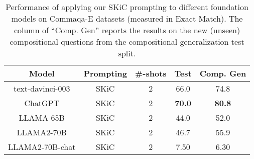 \documentclass{article} \usepackage{arxiv}
\begin{document}
\begin{table}[ht]
\caption{Performance of applying our SKiC prompting to different foundation models on Commaqa-E datasets (measured in Exact Match). The column of ``Comp. Gen'' reports the results on the new (unseen) compositional questions from the compositional generalization test split.} \label{Tab:qa_results_llama2}
\centering
\small
\begin{tabular}{c|c|c|cc} \toprule
\textbf{Model}             & \textbf{Prompting} &\textbf{\#-shots} & \multicolumn{1}{l}{\textbf{Test}} & \multicolumn{1}{l}{\textbf{Comp. Gen}} \\ \midrule \midrule

\multirow{1}{*}{text-davinci-003} 
                           &  SKiC   &2  &66.0                     & 74.8                         \\ 
\multirow{1}{*}{ChatGPT}  
                           & SKiC   &2   & \textbf{70.0}                    & \textbf{80.8}                 \\ \midrule

\multirow{1}{*}{LLAMA-65B} 
                           &  SKiC &2    & 44.0                     & 52.0                         \\ 

\multirow{1}{*}{LLAMA2-70B} 
                           &  SKiC &2    &46.7                  & 55.9                         \\ 
\multirow{1}{*}{LLAMA2-70B-chat} 
                           &  SKiC &2    & 7.50                     & 6.30                        \\ \bottomrule        
\end{tabular} 
\end{table}
\end{document}
